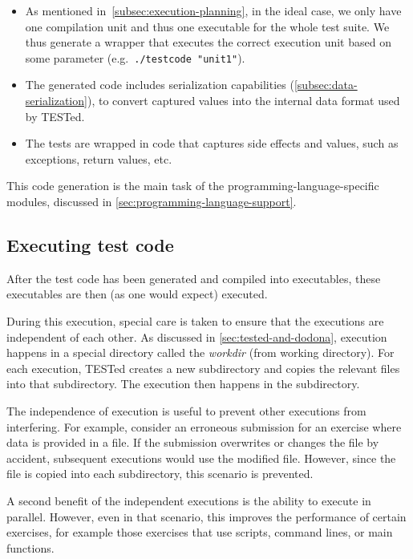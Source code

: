 \documentclass[../main]{subfiles}
\begin{document}
\begin{itemize}
    \item As mentioned in~\cref{subsec:execution-planning}, in the ideal case, we only have one compilation unit and thus one executable for the whole test suite.
     We thus generate a wrapper that executes the correct execution unit based on some parameter (e.g.\ \texttt{./testcode "unit1"}).
    \item The generated code includes serialization capabilities (\cref{subsec:data-serialization}), to convert captured values into the internal data format used by TESTed.
    \item The tests are wrapped in code that captures side effects and values, such as exceptions, return values, etc.
\end{itemize}

This code generation is the main task of the programming-language-specific modules, discussed in \cref{sec:programming-language-support}.

\subsection{Executing test code}\label{subsec:executing-test-code}

After the test code has been generated and compiled into executables, these executables are then (as one would expect) executed.

During this execution, special care is taken to ensure that the executions are independent of each other.
As discussed in \cref{sec:tested-and-dodona}, execution happens in a special directory called the \emph{workdir} (from working directory).
For each execution, TESTed creates a new subdirectory and copies the relevant files into that subdirectory.
The execution then happens in the subdirectory.

The independence of execution is useful to prevent other executions from interfering.
For example, consider an erroneous submission for an exercise where data is provided in a file.
If the submission overwrites or changes the file by accident, subsequent executions would use the modified file.
However, since the file is copied into each subdirectory, this scenario is prevented.

A second benefit of the independent executions is the ability to execute in parallel.
However, even in that scenario, this improves the performance of certain exercises, for example those exercises that use scripts, command lines, or main functions.
\end{document}
